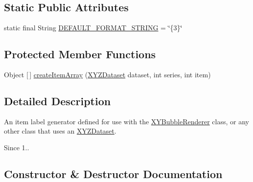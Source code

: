 \subsection*{Static Public Attributes}
\begin{DoxyCompactItemize}
\item 
static final String \mbox{\hyperlink{classorg_1_1jfree_1_1chart_1_1labels_1_1_bubble_x_y_item_label_generator_aed32b2340209861cb1b7f1fb084ea3e9}{D\+E\+F\+A\+U\+L\+T\+\_\+\+F\+O\+R\+M\+A\+T\+\_\+\+S\+T\+R\+I\+NG}} = \char`\"{}\{3\}\char`\"{}
\end{DoxyCompactItemize}
\subsection*{Protected Member Functions}
\begin{DoxyCompactItemize}
\item 
Object \mbox{[}$\,$\mbox{]} \mbox{\hyperlink{classorg_1_1jfree_1_1chart_1_1labels_1_1_bubble_x_y_item_label_generator_a73109c6622270587261c8075ef82f6de}{create\+Item\+Array}} (\mbox{\hyperlink{interfaceorg_1_1jfree_1_1data_1_1xy_1_1_x_y_z_dataset}{X\+Y\+Z\+Dataset}} dataset, int series, int item)
\end{DoxyCompactItemize}


\subsection{Detailed Description}
An item label generator defined for use with the \mbox{\hyperlink{}{X\+Y\+Bubble\+Renderer}} class, or any other class that uses an \mbox{\hyperlink{}{X\+Y\+Z\+Dataset}}.

\begin{DoxySince}{Since}
1.. 
\end{DoxySince}


\subsection{Constructor \& Destructor Documentation}
\mbox{\label{classorg_1_1jfree_1_1chart_1_1labels_1_1_bubble_x_y_item_label_generator_ad6d484f9b8fc92c9894e55f46b86aefc}} 
